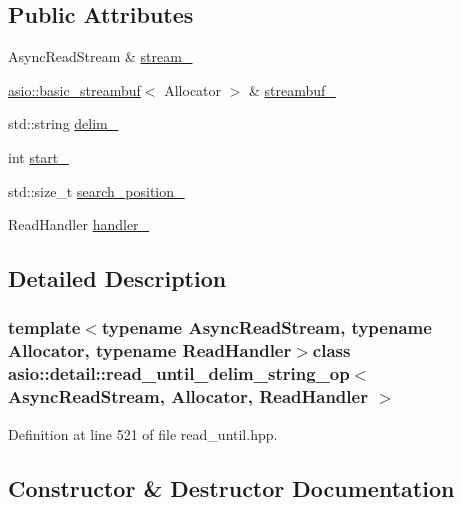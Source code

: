 \subsection*{Public Attributes}
\begin{DoxyCompactItemize}
\item 
Async\+Read\+Stream \& \hyperlink{classasio_1_1detail_1_1read__until__delim__string__op_afcad1583fe64f8d6eb8b5ca51b0f2510}{stream\+\_\+}
\item 
\hyperlink{classasio_1_1basic__streambuf}{asio\+::basic\+\_\+streambuf}$<$ Allocator $>$ \& \hyperlink{classasio_1_1detail_1_1read__until__delim__string__op_a5ceafbc126fdd4ca7025d250e9d4fcdf}{streambuf\+\_\+}
\item 
std\+::string \hyperlink{classasio_1_1detail_1_1read__until__delim__string__op_a24e5eb26f7b7fcb147e690b659acc2f5}{delim\+\_\+}
\item 
int \hyperlink{classasio_1_1detail_1_1read__until__delim__string__op_a6a220ea1de38a1c04f0dc706b9e6f04c}{start\+\_\+}
\item 
std\+::size\+\_\+t \hyperlink{classasio_1_1detail_1_1read__until__delim__string__op_ae47f60cd8b8f757c747b83ac1a50a5ec}{search\+\_\+position\+\_\+}
\item 
Read\+Handler \hyperlink{classasio_1_1detail_1_1read__until__delim__string__op_ac2a5d6356c57ee87c7a0b21fc50dee8f}{handler\+\_\+}
\end{DoxyCompactItemize}


\subsection{Detailed Description}
\subsubsection*{template$<$typename Async\+Read\+Stream, typename Allocator, typename Read\+Handler$>$class asio\+::detail\+::read\+\_\+until\+\_\+delim\+\_\+string\+\_\+op$<$ Async\+Read\+Stream, Allocator, Read\+Handler $>$}



Definition at line 521 of file read\+\_\+until.\+hpp.



\subsection{Constructor \& Destructor Documentation}
\hypertarget{classasio_1_1detail_1_1read__until__delim__string__op_aa2df29e1d309ef89d7df5d1f2558eb71}{}
